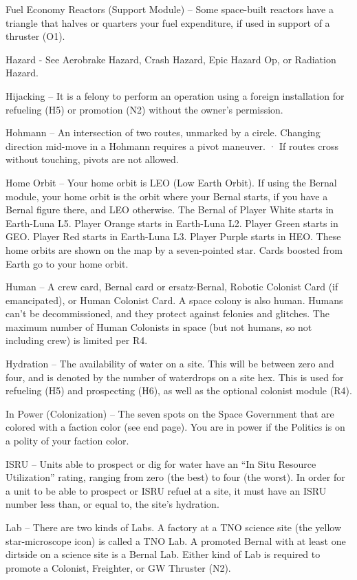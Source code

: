 \documentclass[a4paper]{book}
\begin{document}
Fuel Economy Reactors (Support Module) – Some space-built reactors have a triangle that halves or quarters your fuel expenditure, if used in support of a thruster (O1).

Hazard - See Aerobrake Hazard, Crash Hazard, Epic Hazard Op, or Radiation Hazard.

Hijacking – It is a felony to perform an operation using a foreign installation for refueling (H5) or promotion (N2) without the owner’s permission.

Hohmann – An intersection of two routes, unmarked by a circle. Changing direction mid-move in a Hohmann requires a pivot maneuver.
·   	If routes cross without touching, pivots are not allowed.

Home Orbit – Your home orbit is LEO (Low Earth Orbit). If using the Bernal module, your home orbit is the orbit where your Bernal starts, if you have a Bernal figure there, and LEO otherwise. The Bernal of Player White starts in Earth-Luna L5. Player Orange starts in Earth-Luna L2. Player Green starts in GEO. Player Red starts in Earth-Luna L3. Player Purple starts in HEO. These home orbits are shown on the map by a seven-pointed star. Cards boosted from Earth go to your home orbit.

Human – A crew card, Bernal card or ersatz-Bernal, Robotic Colonist Card (if emancipated), or Human Colonist Card. A space colony is also human. Humans can’t be decommissioned, and they protect against felonies and glitches. The maximum number of Human Colonists in space (but not humans, so not including crew) is limited per R4.

Hydration – The availability of water on a site. This will be between zero and four, and is denoted by the number of waterdrops on a site hex. This is used for refueling (H5) and prospecting (H6), as well as the optional colonist module (R4).

In Power (Colonization) – The seven spots on the Space Government that are colored with a faction color (see end page). You are in power if the Politics is on a polity of your faction color.

ISRU – Units able to prospect or dig for water have an “In Situ Resource Utilization” rating, ranging from zero (the best) to four (the worst). In order for a unit to be able to prospect or ISRU refuel at a site, it must have an ISRU number less than, or equal to, the site’s hydration.

Lab – There are two kinds of Labs. A factory at a TNO science site (the yellow star-microscope icon) is called a TNO Lab. A promoted Bernal with at least one dirtside on a science site is a Bernal Lab.
Either kind of Lab is required to promote a Colonist, Freighter, or GW Thruster (N2).
\end{document}
